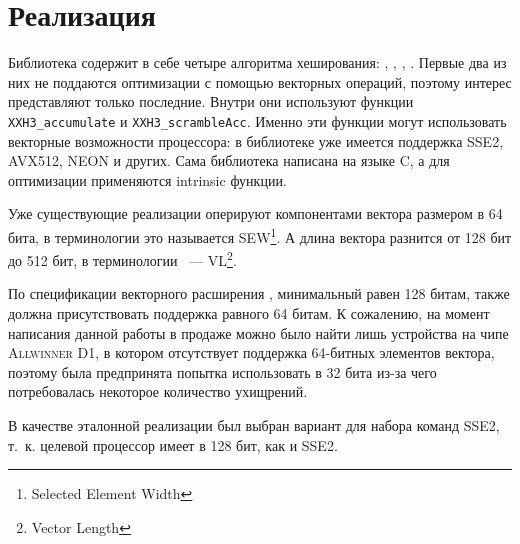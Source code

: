 
\section{Реализация}

Библиотека содержит в себе четыре алгоритма хеширования: , , , .
Первые два из них не поддаются оптимизации с помощью векторных операций, поэтому интерес представляют только последние.
Внутри они используют функции \texttt{XXH3\_accumulate} и \texttt{XXH3\_scrambleAcc}.
Именно эти функции могут использовать векторные возможности процессора: в библиотеке уже имеется поддержка \textsc{SSE2, AVX512, NEON} и других.
Сама библиотека написана на языке \textsc{C}, а для оптимизации применяются intrinsic функции.

Уже существующие реализации оперируют компонентами вектора размером в 64 бита, в терминологии \riscv{} это называется \textsc{SEW\footnote{Selected Element Width}}.
А длина вектора разнится от 128 бит до 512 бит, в терминологии \riscv{}~--- \textsc{VL\footnote{Vector Length}}.

По спецификации векторного расширения \riscv{}, минимальный \vl{} равен 128 битам, также должна присутствовать поддержка \sew{} равного 64 битам.
К сожалению, на момент написания данной работы в продаже можно было найти лишь устройства на чипе \textsc{Allwinner D1}, в котором отсутствует поддержка 64-битных элементов вектора, поэтому была предпринята попытка использовать \sew{} в 32 бита из-за чего потребовалась некоторое количество ухищрений.

В качестве эталонной реализации был выбран вариант для набора команд \textsc{SSE2}, т.~к. целевой процессор имеет \vl{} в 128 бит, как и \textsc{SSE2}.


